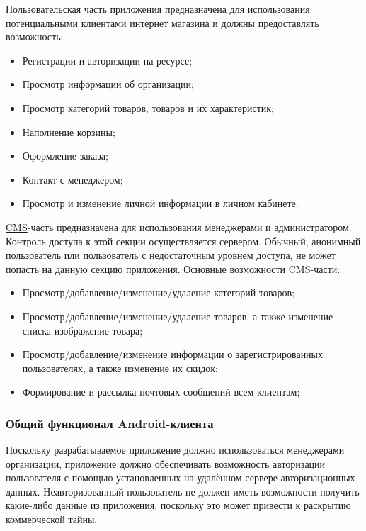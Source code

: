 Пользовательская часть приложения предназначена для использования потенциальными клиентами интернет магазина и должны предоставлять возможность:

\begin{itemize}
    \item Регистрации и авторизации на ресурсе;
    \item Просмотр информации об организации;
    \item Просмотр категорий товаров, товаров и их характеристик;
    \item Наполнение корзины;
    \item Оформление заказа;
    \item Контакт с менеджером;
    \item Просмотр и изменение личной информации в личном кабинете.
\end{itemize}

\hyperlink{gloss:cms}{CMS}-часть предназначена для использования менеджерами и администратором.
Контроль доступа к этой секции осуществляется сервером.
Обычный, анонимный пользователь или пользователь с недостаточным уровнем доступа, не может попасть на данную секцию приложения.
Основные возможности \hyperlink{gloss:cms}{CMS}-части:

\begin{itemize}
    \item Просмотр/добавление/изменение/удаление категорий товаров;
    \item Просмотр/добавление/изменение/удаление товаров, а также изменение списка изображение товара;
    \item Просмотр/добавление/изменение информации о зарегистрированных пользователях, а также изменение их скидок;
    \item Формирование и рассылка почтовых сообщений всем клиентам;
\end{itemize}

\subsubsection{Общий функционал Android-клиента}\indent

Поскольку разрабатываемое приложение должно использоваться менеджерами организации, приложение должно обеспечивать возможность авторизации пользователя с помощью установленных на удалённом сервере авторизационных данных. Неавторизованный пользователь не должен иметь возможности получить какие-либо данные из приложения, поскольку это может привести к раскрытию коммерческой тайны.

